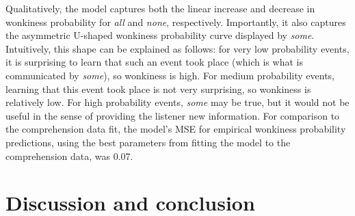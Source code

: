 \documentclass[10pt,letterpaper]{article}
\newcommand{\red}[1]{\textcolor{Red}{#1}}
\begin{document}
Qualitatively, the model captures both the linear increase and decrease in wonkiness probability for \emph{all} and \emph{none}, respectively. Importantly, it also captures the asymmetric U-shaped wonkiness probability curve displayed by \emph{some}. Intuitively, this shape can be explained as follows: for very low probability events, it is surprising to learn that such an event took place (which is what is communicated by \emph{some}), so wonkiness is high. For medium probability events, learning that this event took place is not very surprising, so wonkiness is relatively low. For high probability events, \emph{some} may be true, but it would not be useful in the sense of providing the listener new information. For comparison to the comprehension data fit, the model's MSE for empirical wonkiness probability predictions, using the best parameters from fitting the model to the comprehension data, was 0.07. 











\section{Discussion and conclusion}


\end{document}
